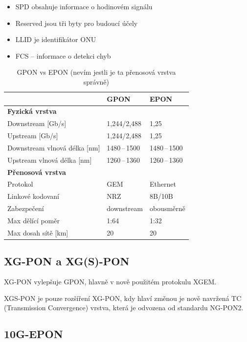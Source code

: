 \begin{itemize}
    \item SPD obsahuje informace o hodinovém signálu
    \item Reserved jsou tři byty pro budoucí účely
    \item LLID je identifikátor ONU
    \item FCS -- informace o detekci chyb
\end{itemize}

\clearpage

\begin{table}[ht]
    \centering
    \caption{GPON vs EPON (nevím jestli je ta přenosová vrstva správně)}
    \begin{tabular}{|l|l|l|}
        \hline
        & GPON & EPON \\\hline\hline
        \textbf{Fyzická vrstva} & & \\\hline\hline
        Downstream [Gb/s] & 1,244/2,488 & 1,25 \\\hline
        Upstream [Gb/s] & 1,244/2,488 & 1,25 \\\hline
        Downstream vlnová délka [nm] & 1480\,--\,1500 & 1480\,--\,1500 \\\hline
        Upstream vlnová délka [nm] & 1260\,--\,1360 & 1260\,--\,1360 \\\hline\hline
        \textbf{Přenosová vrstva} & & \\\hline\hline
        Protokol & GEM & Ethernet \\\hline
        Linkové kodovaní & NRZ & 8B/10B \\\hline
        Zabezpečení & downstream & obousměrně \\\hline
        Max dělící poměr & 1:64 & 1:32 \\\hline
        Max dosah sítě [km] & 20 & 20 \\\hline
    \end{tabular}
\end{table}

\subsection{XG-PON a XG(S)-PON}

XG-PON vylepšuje GPON, hlavně v nově použitém protokulu XGEM. 

XGS-PON je pouze rozšíření XG-PON, kdy hlaví změnou je nově navržená TC (Transmission Convergence) vrstva, která je odvozena od standardu NG-PON2.

\subsection{10G-EPON}

